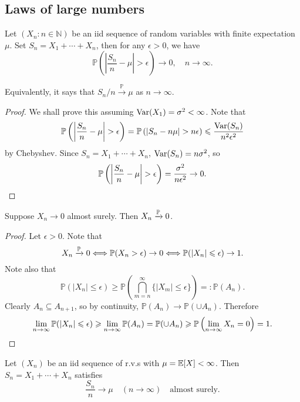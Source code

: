 \subsection{Laws of large numbers}
\begin{theorem}\label{thm:Weak law of large numbers}
    Let $(X_n:n\in\mathbb N)$ be an iid sequence of random variables with finite expectation $\mu$.
    Set $S_n=X_1+\cdots+X_n$, then for any $\epsilon>0$, we have
    $$\mathbb P\left( \left|\frac{S_n}{n}-\mu\right|>\epsilon \right)\to 0,\quad n\to\infty.$$
\end{theorem}
\begin{note}
    Equivalently, it says that $S_n/n\xrightarrow{\mathbb P}\mu$ as $n\to\infty$.
\end{note}
\begin{proof}
    We shall prove this assuming $\var (X_1)=\sigma^2<\infty$. Note that 
    \[
        \mathbb{P}\left( \left| \frac{S_n}{n}-\mu \right| >\epsilon \right) = \mathbb{P}\left( \left| S_n-n\mu \right| >n\epsilon \right) \le \frac{\var(S_n)}{n^2 \epsilon^2}
    \]
    by Chebyshev. Since $ S_n=X_1+\cdots+X_n $, $ \var(S_n)=n\sigma^2 $, so 
    \[
        \mathbb{P}\left( \left| \frac{S_n}{n}-\mu \right| >\epsilon \right)=\frac{\sigma^2}{n\epsilon^2}\to 0.\qedhere
    \]
\end{proof}
\begin{proposition}
    Suppose $ X_n\to 0 $ almost surely. Then $ X_n \xrightarrow{\bbP} 0$.
\end{proposition}
\begin{proof}
    Let $ \epsilon>0 $. Note that
    \[
        X_n \xrightarrow{\bbP}0 \Longleftrightarrow \bbP(X_n>\epsilon)\to 0 \Longleftrightarrow \mathbb{P}(|X_n|\le \epsilon)\to 1.
    \]
    Note also that 
    \[
        \mathbb{P}(|X_n|\le \epsilon)\ge \mathbb{P}\left( \bigcap_{m=n}^{\infty}\{|X_m|\le \epsilon\} \right) =: \mathbb{P}(A_n). 
    \]
    Clearly $A_n \subseteq A_{n+1}$, so by continuity, $ \mathbb{P}(A_n) \to \mathbb{P}(\cup A_n) $. Therefore 
    \[
        \lim_{n \to \infty} \mathbb{P}(|X_n|\le \epsilon) \ge \lim_{n \to \infty} \mathbb{P}(A_n) = \mathbb{P}(\cup A_n)\ge \mathbb{P}\left( \lim_{n \to \infty} X_n=0 \right)=1.\qedhere
    \]
\end{proof}
\begin{theorem}\label{thm:Strong law of large numbers}
    Let $ (X_n) $ be an iid sequence of r.v.s with $ \mu=\bbE[X]<\infty  $. Then $ S_n=X_1+\cdots+X_n $ satisfies 
    \[
        \frac{S_n}{n}\to \mu\quad (n\to \infty) \quad \text{almost surely}.
    \]
\end{theorem}
